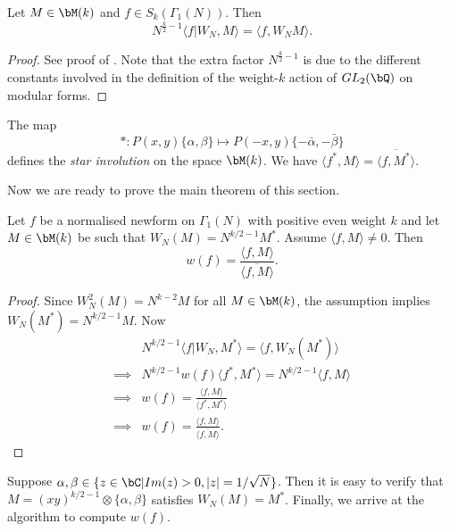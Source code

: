\documentclass [11pt, proquest] {uwthesis}[2015/03/03]
\begin{document}
\begin{Lemma}
Let $M \in \bM(k)$ and $f \in S_k(\Gamma_1(N))$. Then 
\[
	N^{\frac{k}{2}-1} \langle f|W_N, M \rangle = \langle f, W_N M \rangle.
\]
\end{Lemma}

\begin{proof}
See proof of  \cite[Proposition 8.17]{stein2007modular}. Note that the extra factor $N^{\frac{k}{2}-1}$ is due to the different constants involved in the definition of the weight-$k$ action of $GL_2(\bQ)$ on modular forms. 
\end{proof}

The map  
\[
	*: P(x,y)\{\alpha, \beta\} \mapsto P(-x,y) \{-\bar{\alpha}, -\bar{\beta}\} 
\]
defines the {\it star involution} on the space $\bM(k)$. We have $\langle f^*, M \rangle = \overline{\langle f, M^*\rangle}.$


Now we are ready to prove the main theorem of this section.
\begin{theorem}
Let $f$ be a normalised newform on $\Gamma_1(N)$ with positive even weight $k$ and let $M \in \bM(k)$ be such that $W_N(M) = N^{k/2 -1} M^*$. Assume $\langle f, M \rangle \neq 0$.  Then 
\[
	w(f) = \frac{\langle f,M \rangle }{\overline{\langle f,M \rangle}}.
\]
\end{theorem} 

\begin{proof}
Since $W_N^2(M) = N^{k-2}M$ for all $M \in \bM(k)$, the assumption implies $W_N(M^*) = N^{k/2 -1} M$. 
Now 
\begin{align*}
& N^{k/2-1} \langle f|W_N, M^* \rangle  = \langle f,W_N(M^*) \rangle \\
\implies & N^{k/2-1} w(f) \langle   f^*,M^* \rangle = N^{k/2-1} \langle f, M \rangle \\
\implies & w(f) = \frac{\langle f, M \rangle}{\langle f^*,M^* \rangle} \\ 
\implies &	w(f) = \frac{\langle f, M \rangle}{\overline{\langle f, M \rangle}}.
\end{align*}
\end{proof}

Suppose $\alpha, \beta \in \{z \in \bC | Im(z) > 0,  |z| = 1/\sqrt{N}\}$. Then it is easy to verify that $M = (xy)^{k/2-1} \otimes \{\alpha, \beta\}$ satisfies $W_N(M) = M^*$. Finally, we arrive at the algorithm to compute $w(f)$.
\end{document}

